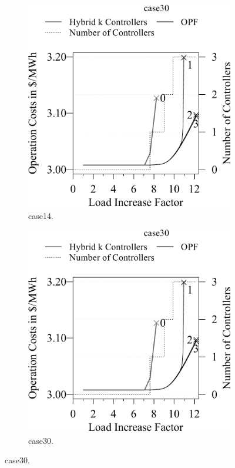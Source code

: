 \begin{figure}[t!]
\begin{subfigure}[t]{.45\textwidth}
    \centering
        \includegraphics[width=0.95\linewidth, page=5]{factsplacement/plots/plotCapacityReductionVsCostsController.pdf}
  \caption{case14.}
    \label{ch:appendix:sec:facts:fig:plot-capacity-cost-controller-case14}
\end{subfigure}
\hfill
\begin{subfigure}[t]{.45\textwidth}
    \centering
        \includegraphics[width=0.95\linewidth, page=1]{factsplacement/plots/plotCapacityReductionVsCostsController.pdf}
  \caption{case30.}
    \label{ch:appendix:sec:facts:fig:plot-capacity-cost-controller-case30}
\end{subfigure}


\end{figure}
